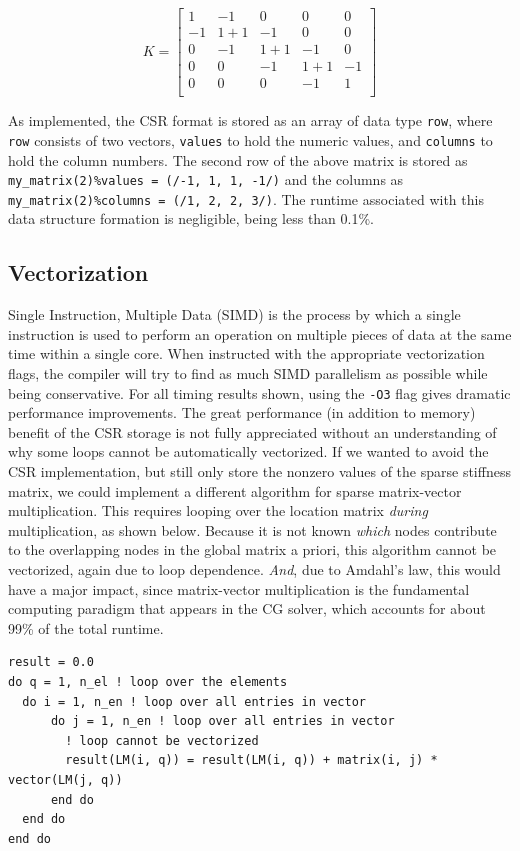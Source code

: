 \documentclass[10pt]{article}
\newcommand{\beq}{\begin{equation}}
\newcommand{\eeq}{\end{equation}}
\begin{document}
\beq
K=\begin{bmatrix}
1 & -1 & 0 & 0 & 0\\
-1 & 1 + 1 & -1 & 0 & 0\\
0 & -1 & 1 + 1 & -1 & 0\\
0 & 0 & -1 & 1 + 1 & -1\\
0 & 0 & 0 & -1 & 1\\
\end{bmatrix}
\eeq

As implemented, the CSR format is stored as an array of data type {\tt row}, where {\tt row} consists of two vectors, {\tt values} to hold the numeric values, and {\tt columns} to hold the column numbers. The second row of the above matrix is stored as {\tt my\_matrix(2)\%values = (/-1, 1, 1, -1/)} and the columns as {\tt my\_matrix(2)\%columns = (/1, 2, 2, 3/)}. The runtime associated with this data structure formation is negligible, being less than 0.1\%. 

\subsection{Vectorization}
Single Instruction, Multiple Data (SIMD) is the process by which a single instruction is used to perform an operation on multiple pieces of data at the same time within a single core. When instructed with the appropriate vectorization flags, the compiler will try to find as much SIMD parallelism as possible while being conservative. For all timing results shown, using the {\tt -O3} flag gives dramatic performance improvements. The great performance (in addition to memory) benefit of the CSR storage is not fully appreciated without an understanding of why some loops cannot be automatically vectorized. If we wanted to avoid the CSR implementation, but still only store the nonzero values of the sparse stiffness matrix, we could implement a different algorithm for sparse matrix-vector multiplication. This requires looping over the location matrix {\it during} multiplication, as shown below. Because it is not known {\it which} nodes contribute to the overlapping nodes in the global matrix a priori, this algorithm cannot be vectorized, again due to loop dependence. {\it And}, due to Amdahl's law, this would have a major impact, since matrix-vector multiplication is the fundamental computing paradigm that appears in the CG solver, which accounts for about 99\% of the total runtime.

\begin{lstlisting}
result = 0.0
do q = 1, n_el ! loop over the elements
  do i = 1, n_en ! loop over all entries in vector
      do j = 1, n_en ! loop over all entries in vector
        ! loop cannot be vectorized
        result(LM(i, q)) = result(LM(i, q)) + matrix(i, j) * vector(LM(j, q))
      end do
  end do
end do
\end{lstlisting}
\end{document}
